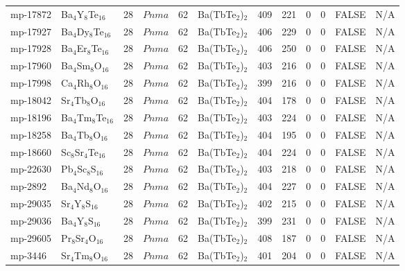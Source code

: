 {\begin{longtable}{llcccccccccc}
    mp-17872 & Ba$_{4}$Y$_{8}$Te$_{16}$ & 28    & $Pnma$ & 62    & Ba(TbTe$_{2}$)$_{2}$ & 409   & 221   & 0     & 0     & FALSE & N/A \\
    mp-17927 & Ba$_{4}$Dy$_{8}$Te$_{16}$ & 28    & $Pnma$ & 62    & Ba(TbTe$_{2}$)$_{2}$ & 406   & 229   & 0     & 0     & FALSE & N/A \\
    mp-17928 & Ba$_{4}$Er$_{8}$Te$_{16}$ & 28    & $Pnma$ & 62    & Ba(TbTe$_{2}$)$_{2}$ & 406   & 250   & 0     & 0     & FALSE & N/A \\
    mp-17960 & Ba$_{4}$Sm$_{8}$O$_{16}$ & 28    & $Pnma$ & 62    & Ba(TbTe$_{2}$)$_{2}$ & 403   & 216   & 0     & 0     & FALSE & N/A \\
    mp-17998 & Ca$_{4}$Rh$_{8}$O$_{16}$ & 28    & $Pnma$ & 62    & Ba(TbTe$_{2}$)$_{2}$ & 399   & 216   & 0     & 0     & FALSE & N/A \\
    mp-18042 & Sr$_{4}$Tb$_{8}$O$_{16}$ & 28    & $Pnma$ & 62    & Ba(TbTe$_{2}$)$_{2}$ & 404   & 178   & 0     & 0     & FALSE & N/A \\
    mp-18196 & Ba$_{4}$Tm$_{8}$Te$_{16}$ & 28    & $Pnma$ & 62    & Ba(TbTe$_{2}$)$_{2}$ & 403   & 224   & 0     & 0     & FALSE & N/A \\
    mp-18258 & Ba$_{4}$Tb$_{8}$O$_{16}$ & 28    & $Pnma$ & 62    & Ba(TbTe$_{2}$)$_{2}$ & 404   & 195   & 0     & 0     & FALSE & N/A \\
    mp-18660 & Sc$_{8}$Sr$_{4}$Te$_{16}$ & 28    & $Pnma$ & 62    & Ba(TbTe$_{2}$)$_{2}$ & 404   & 224   & 0     & 0     & FALSE & N/A \\
    mp-22630 & Pb$_{4}$Sc$_{8}$S$_{16}$ & 28    & $Pnma$ & 62    & Ba(TbTe$_{2}$)$_{2}$ & 403   & 218   & 0     & 0     & FALSE & N/A \\
    mp-2892 & Ba$_{4}$Nd$_{8}$O$_{16}$ & 28    & $Pnma$ & 62    & Ba(TbTe$_{2}$)$_{2}$ & 404   & 227   & 0     & 0     & FALSE & N/A \\
    mp-29035 & Sr$_{4}$Y$_{8}$S$_{16}$ & 28    & $Pnma$ & 62    & Ba(TbTe$_{2}$)$_{2}$ & 402   & 215   & 0     & 0     & FALSE & N/A \\
    mp-29036 & Ba$_{4}$Y$_{8}$S$_{16}$ & 28    & $Pnma$ & 62    & Ba(TbTe$_{2}$)$_{2}$ & 399   & 231   & 0     & 0     & FALSE & N/A \\
    mp-29605 & Pr$_{8}$Sr$_{4}$O$_{16}$ & 28    & $Pnma$ & 62    & Ba(TbTe$_{2}$)$_{2}$ & 408   & 187   & 0     & 0     & FALSE & N/A \\
    mp-3446 & Sr$_{4}$Tm$_{8}$O$_{16}$ & 28    & $Pnma$ & 62    & Ba(TbTe$_{2}$)$_{2}$ & 401   & 204   & 0     & 0     & FALSE & N/A \\

\end{longtable}}
